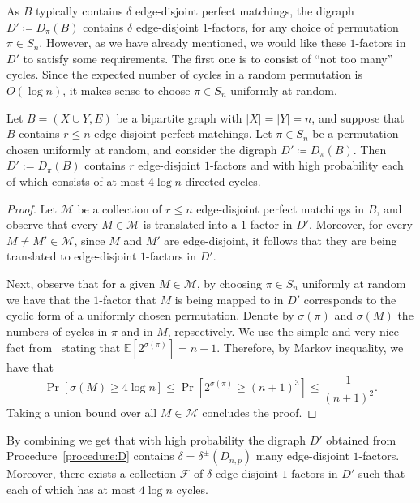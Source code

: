 \documentclass{article}
\begin{document}
	As $B$ typically contains $\delta$ edge-disjoint perfect matchings, the digraph $D' \coloneqq D_{\pi}(B)$ contains $\delta$ edge-disjoint $1$-factors, for any choice of permutation $\pi \in S_n$.
	However, as we have already mentioned, we would like these $1$-factors in $D'$ to satisfy some requirements.
	The first one is to consist of ``not too many'' cycles. Since the expected number of cycles in a random permutation is $O(\log n)$, it makes sense to choose $\pi \in S_n$ uniformly at random.
	
	\begin{lemma}
		\label{lem:fewcycles}
		Let $B=(X\cup Y,E)$ be a bipartite graph with $|X|=|Y|=n$, and suppose that $B$ contains $r\leq n$ edge-disjoint perfect matchings.
		Let $\pi \in S_n$ be a permutation chosen uniformly at random, and consider the digraph $D' \coloneqq D_{\pi}(B)$. Then $D':=D_{\pi}(B)$ contains $r$ edge-disjoint $1$-factors and with high probability each of which consists of at most $4\log n$ directed cycles.
	\end{lemma}
	
	\begin{proof}
		Let $\mathcal M$ be a collection of $r \le n$ edge-disjoint perfect matchings in $B$, and observe that every $M\in \mathcal M$ is translated into a $1$-factor in $D'$.
		Moreover, for every $M\neq M' \in \mathcal M$, since $M$ and $M'$ are edge-disjoint, it follows that they are being translated to edge-disjoint $1$-factors in $D'$.
		
		Next, observe that for a given $M\in \mathcal M$, by choosing $\pi\in S_n$ uniformly at random we have that the $1$-factor that $M$ is being mapped to in $D'$ corresponds to the cyclic form of a uniformly chosen permutation.
		Denote by $\sigma(\pi)$ and $\sigma(M)$ the numbers of cycles in $\pi$ and in $M$, repsectively.
		We use the simple and very nice fact from~\cite{ford2021cycle} stating that $\mathbb E\left[2^{\sigma(\pi)} \right] = n+1$.
		Therefore, by Markov inequality, we have that
		\[\Pr\left[\sigma(M) \ge 4\log n \right] \le \Pr\left[2^{\sigma(\pi)} \ge (n+1)^3 \right] \le \frac{1}{(n+1)^2}. \]
		Taking a union bound over all $M\in \mathcal M$ concludes the proof.
	\end{proof}
	
	By combining  we get that with high probability the digraph $D'$ obtained from Procedure~\ref{procedure:D} contains $\delta = \delta^{\pm}(D_{n,p})$ many edge-disjoint $1$-factors.
	Moreover, there exists a collection $\mathcal F$ of $\delta$ edge-disjoint $1$-factors in $D'$ such that each of which has at most $4\log n$ cycles.
	
\end{document}
